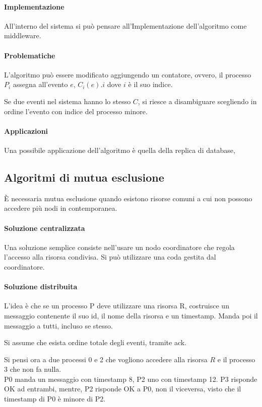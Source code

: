 \paragraph{Implementazione}
All'interno del sistema si può pensare all'Implementazione
dell'algoritmo come middleware.

\paragraph{Problematiche}
L'algoritmo può essere modificato aggiungendo un contatore, 
ovvero, il processo $P_i$ assegna all'evento 
$e$, $C_i(e).i$ dove $i$ è il suo indice.

Se due eventi nel sistema hanno lo stesso $C$, si riesce 
a disambiguare scegliendo in ordine l'evento con indice 
del processo minore.

\paragraph{Applicazioni}
Una possibile applicazione dell'algoritmo è quella 
della replica di database, 

\subsection{Algoritmi di mutua esclusione}
È necessaria mutua esclusione quando esistono risorse 
comuni a cui non possono accedere più nodi in contemporanea.

\paragraph{Soluzione centralizzata}
Una soluzione semplice consiste nell'usare un nodo 
coordinatore che regola l'accesso alla risorsa 
condivisa. Si può utilizzare una coda gestita dal coordinatore.

\paragraph{Soluzione distribuita}
L'idea è che se un processo P deve utilizzare una risorsa
R, costruisce un messaggio contenente il suo id, il nome 
della risorsa e un timestamp. Manda poi il messaggio a tutti, 
incluso se stesso.

Si assume che esista ordine totale degli eventi, tramite 
ack.

Si pensi ora a due processi 0 e 2 che vogliono accedere 
alla risorsa $R$ e il processo 3 che non fa nulla.\\
P0 manda un messaggio con timestamp 8, P2 uno con timestamp 12.
P3 risponde OK ad entrambi, mentre, P2 risponde OK a P0, 
non il viceversa, visto che il timestamp di P0 è minore di P2.

